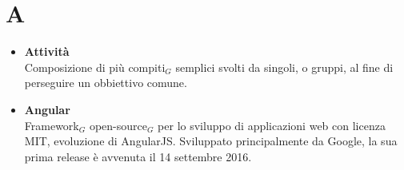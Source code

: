 \chapter{A} \label{A}
\begin{itemize}
		\item \textbf{Attività}\\
		Composizione di più compiti$_G$ semplici svolti da singoli, o gruppi, al fine di perseguire un obbiettivo comune.
		
		\item \textbf{Angular} \\
		Framework$_G$ open-source$_G$ per lo sviluppo di applicazioni web con licenza MIT, evoluzione di AngularJS. Sviluppato principalmente da Google, la sua prima release è avvenuta il 14 settembre 2016.
	\end{itemize}